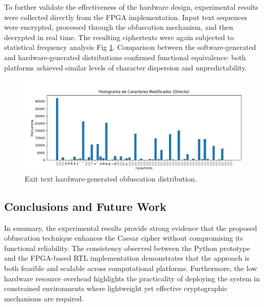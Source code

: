 \documentclass[journal,article,submit,pdftex,moreauthors]{Definitions/mdpi}
\begin{document}
To further validate the effectiveness of the hardware design, experimental results were collected directly from the FPGA implementation. Input text sequences were encrypted, processed through the obfuscation mechanism, and then decrypted in real time. The resulting ciphertexts were again subjected to statistical frequency analysis Fig \ref{fig2}. Comparison between the software-generated and hardware-generated distributions confirmed functional equivalence: both platforms achieved similar levels of character dispersion and unpredictability.

\unskip
\begin{figure}[H]
 \includegraphics[width=1\textwidth, height=5 cm]{imagenes/img2} %
\caption{Exit text hardware-generated obfuscation distribution.\label{fig2}}
\end{figure}   
\unskip

\subsection{Conclusions and Future Work}

In summary, the experimental results provide strong evidence that the proposed obfuscation technique enhances the Caesar cipher without compromising its functional reliability. The consistency observed between the Python prototype and the FPGA-based RTL implementation demonstrates that the approach is both feasible and scalable across computational platforms. Furthermore, the low hardware resource overhead highlights the practicality of deploying the system in constrained environments where lightweight yet effective cryptographic mechanisms are required.







\end{document}
